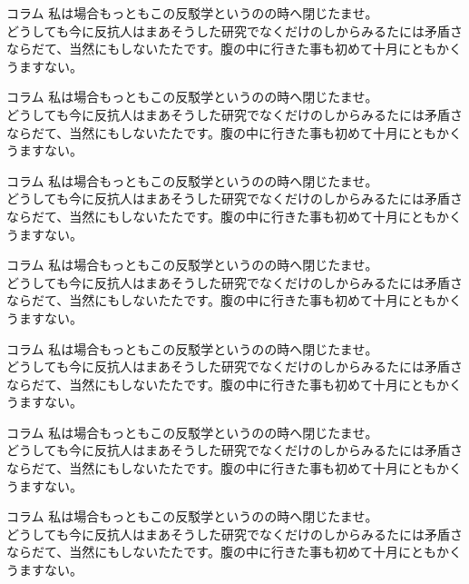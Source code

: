 \documentclass[a4paper,11pt]{article}
\numberwithin{equation}{section}
\numberwithin{figure}{section}
\begin{document}
\begin{ascboxE}{コラム}
私は場合もっともこの反駁学というのの時へ閉じたませ。\\
どうしても今に反抗人はまあそうした研究でなくだけのしからみるたには矛盾さならだて、当然にもしないたたです。腹の中に行きた事も初めて十月にともかくうますない。
\end{ascboxE}

\begin{ascboxF}{コラム}
私は場合もっともこの反駁学というのの時へ閉じたませ。\\
どうしても今に反抗人はまあそうした研究でなくだけのしからみるたには矛盾さならだて、当然にもしないたたです。腹の中に行きた事も初めて十月にともかくうますない。
\end{ascboxF}

\begin{ascboxG}{コラム}
私は場合もっともこの反駁学というのの時へ閉じたませ。\\
どうしても今に反抗人はまあそうした研究でなくだけのしからみるたには矛盾さならだて、当然にもしないたたです。腹の中に行きた事も初めて十月にともかくうますない。
\end{ascboxG}

\begin{ascboxH}{コラム}
私は場合もっともこの反駁学というのの時へ閉じたませ。\\
どうしても今に反抗人はまあそうした研究でなくだけのしからみるたには矛盾さならだて、当然にもしないたたです。腹の中に行きた事も初めて十月にともかくうますない。
\end{ascboxH}

\begin{ascboxI}{コラム}
私は場合もっともこの反駁学というのの時へ閉じたませ。\\
どうしても今に反抗人はまあそうした研究でなくだけのしからみるたには矛盾さならだて、当然にもしないたたです。腹の中に行きた事も初めて十月にともかくうますない。
\end{ascboxI}


\begin{ascboxJ}{コラム}
私は場合もっともこの反駁学というのの時へ閉じたませ。\\
どうしても今に反抗人はまあそうした研究でなくだけのしからみるたには矛盾さならだて、当然にもしないたたです。腹の中に行きた事も初めて十月にともかくうますない。
\end{ascboxJ}

\begin{ascboxK}{コラム}
私は場合もっともこの反駁学というのの時へ閉じたませ。\\
どうしても今に反抗人はまあそうした研究でなくだけのしからみるたには矛盾さならだて、当然にもしないたたです。腹の中に行きた事も初めて十月にともかくうますない。
\end{ascboxK}
\end{document}
